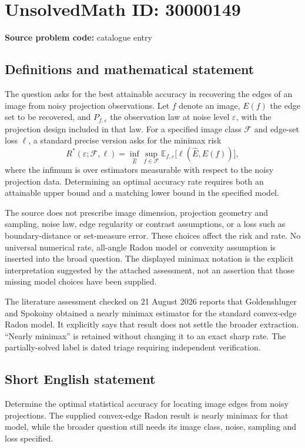\documentclass[11pt]{article}
\begin{document}
\section*{UnsolvedMath ID: 30000149}
\textbf{Source problem code:} catalogue entry
\subsection{Definitions and mathematical statement}
The question asks for the best attainable accuracy in recovering the edges of an image from noisy projection observations. Let $f$ denote an image, $E(f)$ the edge set to be recovered, and $P_{f,\varepsilon}$ the observation law at noise level $\varepsilon$, with the projection design included in that law. For a specified image class $\mathcal F$ and edge-set loss $\ell$, a standard precise version asks for the minimax risk
\[
 R^*(\varepsilon;\mathcal F,\ell)
 =\inf_{\widehat E}\sup_{f\in\mathcal F}
       \mathbb E_{f,\varepsilon}\bigl[\ell(\widehat E,E(f))\bigr],
\]
where the infimum is over estimators measurable with respect to the noisy projection data. Determining an optimal accuracy rate requires both an attainable upper bound and a matching lower bound in the specified model.

The source does not prescribe image dimension, projection geometry and sampling, noise law, edge regularity or contrast assumptions, or a loss such as boundary-distance or set-measure error. These choices affect the risk and rate. No universal numerical rate, all-angle Radon model or convexity assumption is inserted into the broad question. The displayed minimax notation is the explicit interpretation suggested by the attached assessment, not an assertion that those missing model choices have been supplied.

The literature assessment checked on 21 August 2026 reports that Goldenshluger and Spokoiny obtained a nearly minimax estimator for the standard convex-edge Radon model. It explicitly says that result does not settle the broader extraction. ``Nearly minimax'' is retained without changing it to an exact sharp rate. The partially-solved label is dated triage requiring independent verification.
\subsection{Short English statement}
Determine the optimal statistical accuracy for locating image edges from noisy projections. The supplied convex-edge Radon result is nearly minimax for that model, while the broader question still needs its image class, noise, sampling and loss specified.
\end{document}
